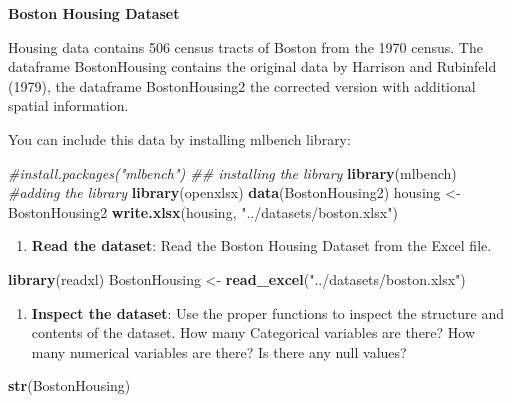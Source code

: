 \documentclass[
]{book}
\newenvironment{Shaded}{\begin{snugshade}}{\end{snugshade}}
\newcommand{\CommentTok}[1]{\textcolor[rgb]{0.56,0.35,0.01}{\textit{#1}}}
\newcommand{\FunctionTok}[1]{\textcolor[rgb]{0.13,0.29,0.53}{\textbf{#1}}}
\newcommand{\NormalTok}[1]{#1}
\newcommand{\OtherTok}[1]{\textcolor[rgb]{0.56,0.35,0.01}{#1}}
\newcommand{\StringTok}[1]{\textcolor[rgb]{0.31,0.60,0.02}{#1}}
\providecommand{\tightlist}{%
  \setlength{\itemsep}{0pt}\setlength{\parskip}{0pt}}
\begin{document}
\textbf{Boston Housing Dataset}

Housing data contains 506 census tracts of Boston from the 1970 census. The dataframe BostonHousing contains the original data by Harrison and Rubinfeld (1979), the dataframe BostonHousing2 the corrected version with additional spatial information.

You can include this data by installing mlbench library:

\begin{Shaded}
\begin{Highlighting}[]
\CommentTok{\#install.packages("mlbench") \#\# installing the library}
\FunctionTok{library}\NormalTok{(mlbench) }\CommentTok{\#adding the library}
\FunctionTok{library}\NormalTok{(openxlsx)}
\FunctionTok{data}\NormalTok{(BostonHousing2)}
\NormalTok{housing }\OtherTok{\textless{}{-}}\NormalTok{ BostonHousing2}
\FunctionTok{write.xlsx}\NormalTok{(housing, }\StringTok{"../datasets/boston.xlsx"}\NormalTok{)}
\end{Highlighting}
\end{Shaded}

\begin{enumerate}
\def\labelenumi{\arabic{enumi}.}
\tightlist
\item
  \textbf{Read the dataset}: Read the Boston Housing Dataset from the Excel file.
\end{enumerate}

\begin{Shaded}
\begin{Highlighting}[]
\FunctionTok{library}\NormalTok{(readxl)}
\NormalTok{BostonHousing }\OtherTok{\textless{}{-}} \FunctionTok{read\_excel}\NormalTok{(}\StringTok{"../datasets/boston.xlsx"}\NormalTok{)}
\end{Highlighting}
\end{Shaded}

\begin{enumerate}
\def\labelenumi{\arabic{enumi}.}
\setcounter{enumi}{1}
\tightlist
\item
  \textbf{Inspect the dataset}: Use the proper functions to inspect the structure and contents of the dataset. How many Categorical variables are there? How many numerical variables are there? Is there any null values?
\end{enumerate}

\begin{Shaded}
\begin{Highlighting}[]
\FunctionTok{str}\NormalTok{(BostonHousing)}
\end{Highlighting}
\end{Shaded}
\end{document}
